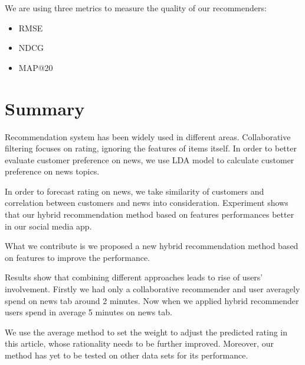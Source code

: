 \documentclass{article}
\begin{document}
We are using three metrics to measure the quality of our recommenders:

    \begin{itemize}
        \item RMSE
        \item NDCG
        \item MAP@20
    \end{itemize}




\section{Summary}
\label{sec:summary}


Recommendation system has been widely used in different areas. Collaborative filtering focuses on rating, ignoring the features of items itself. In order to better evaluate customer preference on news, we use LDA model to
calculate customer preference on news topics.

In order to forecast rating on news, we take similarity of customers and correlation between customers and news into consideration. Experiment shows that our hybrid recommendation method based on features performances better in our social media app.

What we contribute is we proposed a new hybrid recommendation method based on features to improve the performance.

Results show that combining different approaches leads to rise of users' involvement. Firstly we had only a collaborative recommender and user averagely spend on news tab around 2 minutes. Now when we applied hybrid recommender users spend in average 5 minutes on news tab.

We use the average method to set the weight to adjust the predicted rating in this article, whose rationality needs to be further improved. Moreover, our method has yet to be tested on other data sets for its performance.  


  
\end{document}
